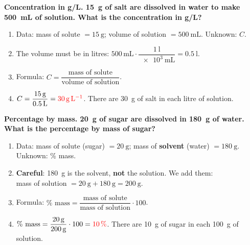 \begin{example}
    \textbf{Concentration in g/L. \qty{15}{\g} of salt are dissolved in water to make \qty{500}{\mL} of solution. What is the concentration in g/L?}
    \begin{enumerate}[label=\numberballmDarkTeal]
        \item Data: mass of solute \(= \qty{15}{\g}\); volume of solution \(= \qty{500}{\mL}\). Unknown: \(C\).
        \item The volume must be in litres: \(\num{500}\,\unit{\mL} \cdot \dfrac{\qty{1}{\litre}}{\qty{e3}{\mL}} = \qty{0.5}{\litre}\).
        \item Formula: \(C = \dfrac{\text{mass of solute}}{\text{volume of solution}}\).
        \item \(C = \dfrac{\qty{15}{\g}}{\qty{0.5}{\litre}} = \textcolor{red}{\qty{30}{\g\per\litre}}\). There are \qty{30}{\g} of salt in each litre of solution.
    \end{enumerate}
\end{example}

\begin{example}
    \textbf{Percentage by mass. \qty{20}{\g} of sugar are dissolved in \qty{180}{\g} of water. What is the percentage by mass of sugar?}
    \begin{enumerate}[label=\numberballmDarkTeal]
        \item Data: mass of solute (sugar) \(= \qty{20}{\g}\); mass of \textbf{solvent} (water) \(= \qty{180}{\g}\). Unknown: \% mass.
        \item \textbf{Careful}: \qty{180}{\g} is the solvent, \textbf{not} the solution. We add them: \\
        mass of solution \(= \qty{20}{\g} + \qty{180}{\g} = \qty{200}{\g}\).
        \item Formula: \(\%\text{ mass} = \dfrac{\text{mass of solute}}{\text{mass of solution}} \cdot 100\).
        \item \(\%\text{ mass} = \dfrac{\qty{20}{\g}}{\qty{200}{\g}} \cdot 100 = \textcolor{red}{\qty{10}{\percent}}\). There are \qty{10}{\g} of sugar in each \qty{100}{\g} of solution.
    \end{enumerate}
\end{example}

